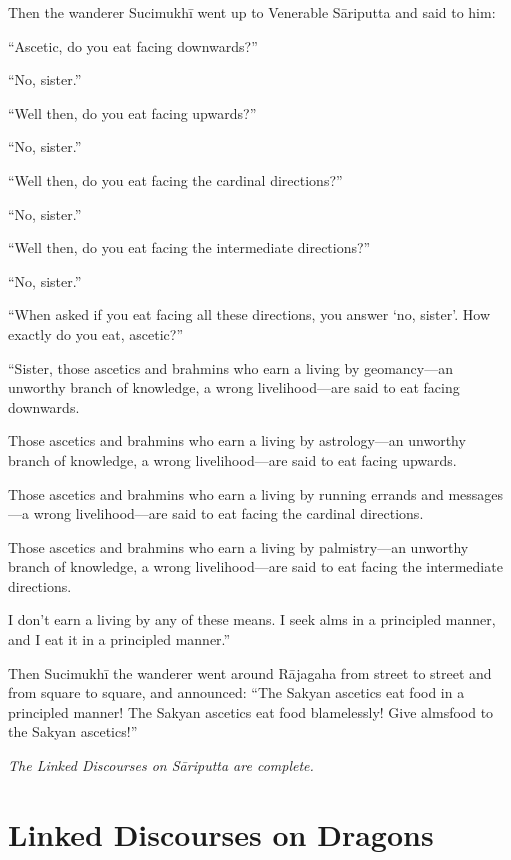 \documentclass[12pt,openany]{book}%
\let\oldcontentsline\contentsline
\newcommand{\nopagecontentsline}[3]{\oldcontentsline{#1}{#2}{}}
\newcommand*{\scendsutta}[1]{\begin{center}\textit{#1}\end{center}}
\begin{document}
Then the wanderer \textsanskrit{Sucimukhī} went up to Venerable \textsanskrit{Sāriputta} and said to him: 

“Ascetic, do you eat facing downwards?” 

“No, sister.” 

“Well then, do you eat facing upwards?” 

“No, sister.” 

“Well then, do you eat facing the cardinal directions?” 

“No, sister.” 

“Well then, do you eat facing the intermediate directions?” 

“No, sister.” 

“When asked if you eat facing all these directions, you answer ‘no, sister’. How exactly do you eat, ascetic?” 

“Sister, those ascetics and brahmins who earn a living by geomancy—an unworthy branch of knowledge, a wrong livelihood—are said to eat facing downwards. 

Those ascetics and brahmins who earn a living by astrology—an unworthy branch of knowledge, a wrong livelihood—are said to eat facing upwards. 

Those ascetics and brahmins who earn a living by running errands and messages—a wrong livelihood—are said to eat facing the cardinal directions. 

Those ascetics and brahmins who earn a living by palmistry—an unworthy branch of knowledge, a wrong livelihood—are said to eat facing the intermediate directions. 

I don’t earn a living by any of these means. I seek alms in a principled manner, and I eat it in a principled manner.” 

Then \textsanskrit{Sucimukhī} the wanderer went around \textsanskrit{Rājagaha} from street to street and from square to square, and announced: “The Sakyan ascetics eat food in a principled manner! The Sakyan ascetics eat food blamelessly! Give almsfood to the Sakyan ascetics!” 

\scendsutta{The Linked Discourses on \textsanskrit{Sāriputta} are complete. }

%
\part*{Linked Discourses on Dragons }
\markboth{}{}
\addtocontents{toc}{\let\protect\contentsline\protect\oldcontentsline}
\end{document}
